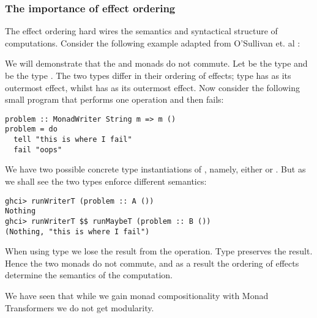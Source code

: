 \subsubsection{The importance of effect ordering}
The effect ordering hard wires the semantics and syntactical structure of computations. Consider the following example adapted from O'Sullivan et. al \cite{O'Sullivan2008}:
\begin{example}
We will demonstrate that the  and  monads do not commute. Let  be the type 
 and  be the type . The two types differ in their ordering of effects; type  has  as its outermost effect, whilst  has  as its outermost effect. Now consider the following small program that performs one  operation and then fails:
\begin{lstlisting}[style=haskell]
problem :: MonadWriter String m => m ()
problem = do
  tell "this is where I fail"
  fail "oops"
\end{lstlisting}
We have two possible concrete type instantiations of , namely, either  or . But as we shall see the two types enforce different semantics:
\begin{lstlisting}[style=haskell]
ghci> runWriterT (problem :: A ())
Nothing
ghci> runWriterT $$ runMaybeT (problem :: B ())
(Nothing, "this is where I fail")
\end{lstlisting}
When using type  we lose the result from the  operation. Type  preserves the result.
Hence the two monads do not commute, and as a result the ordering of effects determine the semantics of the computation.
\end{example}
We have seen that while we gain monad compositionality with Monad Transformers we do not get modularity.